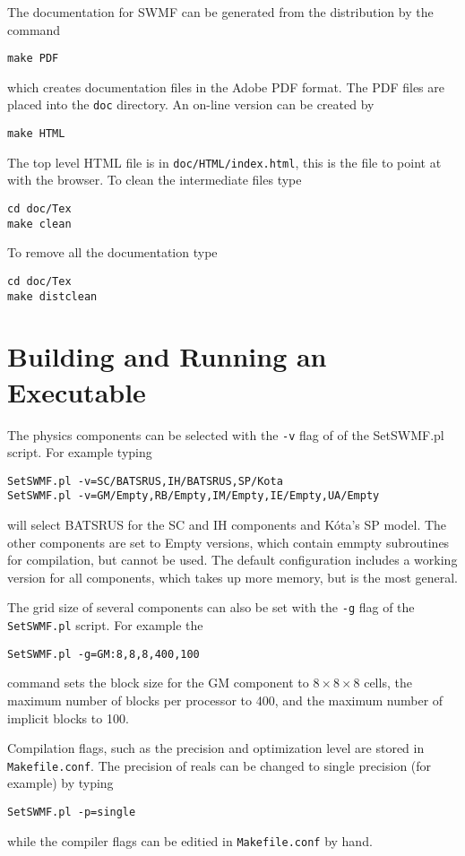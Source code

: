 The documentation for SWMF can be generated from the distribution by
the command
\begin{verbatim}
make PDF
\end{verbatim}
which creates documentation files in the Adobe PDF format.  The PDF
files are placed into the {\tt doc} directory.  An on-line version can
be created by
\begin{verbatim}
make HTML
\end{verbatim}
The top level HTML file is in {\tt doc/HTML/index.html}, this is the file
to point at with the browser.  To clean the intermediate files type
\begin{verbatim}
cd doc/Tex
make clean
\end{verbatim}
To remove all the documentation type
\begin{verbatim}
cd doc/Tex
make distclean
\end{verbatim}

\section{Building and Running an Executable}

The physics components can be selected with the {\tt -v} flag
of of the SetSWMF.pl script. For example typing
\begin{verbatim}
SetSWMF.pl -v=SC/BATSRUS,IH/BATSRUS,SP/Kota
SetSWMF.pl -v=GM/Empty,RB/Empty,IM/Empty,IE/Empty,UA/Empty
\end{verbatim}
will select BATSRUS for the SC and IH components and K\'ota's SP model.
The other components are set to Empty versions, which contain emmpty
subroutines for compilation, but cannot be used.
The default configuration includes a working version for all components, 
which takes up more memory, but is the most general.

The grid size of several components can also be set with the {\tt -g}
flag of the {\tt SetSWMF.pl} script. For example the 
\begin{verbatim}
SetSWMF.pl -g=GM:8,8,8,400,100
\end{verbatim}
command sets the block size for the GM component to $8\times 8\times 8$ cells, 
the maximum number of blocks per processor to 400, 
and the maximum number of implicit blocks to 100.

Compilation flags, such as the precision and optimization 
level are stored in {\tt Makefile.conf}. The precision of reals
can be changed to single precision (for example) by typing
\begin{verbatim}
SetSWMF.pl -p=single
\end{verbatim}
while the compiler flags can be editied in {\tt Makefile.conf} by hand.

